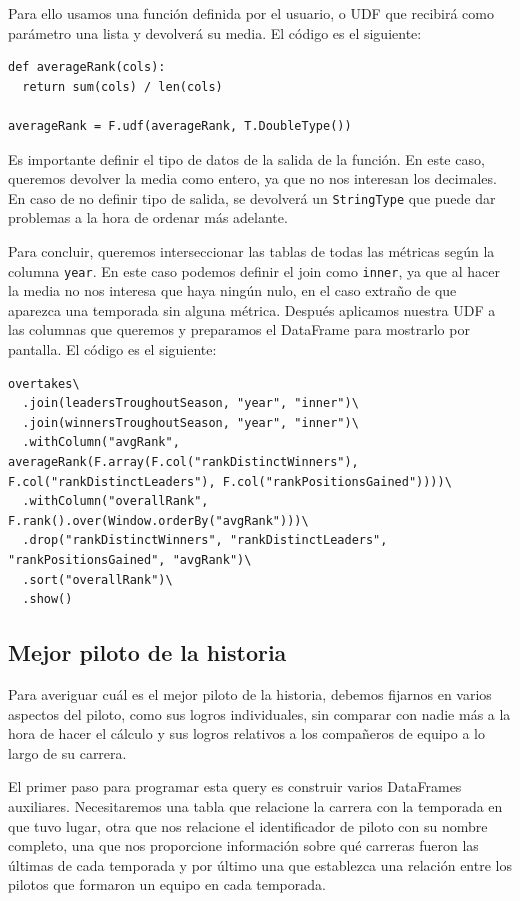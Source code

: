 \documentclass[12pt,twoside,titlepage]{report}
\begin{document}
Para ello usamos una función definida por el usuario, o UDF que recibirá como parámetro una lista y devolverá su media. El código es el siguiente:

\begin{lstlisting}
def averageRank(cols):
  return sum(cols) / len(cols)

averageRank = F.udf(averageRank, T.DoubleType())
\end{lstlisting}

Es importante definir el tipo de datos de la salida de la función. En este caso, queremos devolver la media como entero, ya que no nos interesan los decimales. En caso de no definir tipo de salida, se devolverá un \texttt{StringType} que puede dar problemas a la hora de ordenar más adelante.

Para concluir, queremos interseccionar las tablas de todas las métricas según la columna \texttt{year}. En este caso podemos definir el join como \texttt{inner}, ya que al hacer la media no nos interesa que haya ningún nulo, en el caso extraño de que aparezca una temporada sin alguna métrica. Después aplicamos nuestra UDF a las columnas que queremos y preparamos el DataFrame para mostrarlo por pantalla. El código es el siguiente:

\begin{lstlisting}
overtakes\
  .join(leadersTroughoutSeason, "year", "inner")\
  .join(winnersTroughoutSeason, "year", "inner")\
  .withColumn("avgRank", averageRank(F.array(F.col("rankDistinctWinners"), F.col("rankDistinctLeaders"), F.col("rankPositionsGained"))))\
  .withColumn("overallRank", F.rank().over(Window.orderBy("avgRank")))\
  .drop("rankDistinctWinners", "rankDistinctLeaders", "rankPositionsGained", "avgRank")\
  .sort("overallRank")\
  .show()  
\end{lstlisting}

\subsection{Mejor piloto de la historia}

Para averiguar cuál es el mejor piloto de la historia, debemos fijarnos en varios aspectos del piloto, como sus logros individuales, sin comparar con nadie más a la hora de hacer el cálculo y sus logros relativos a los compañeros de equipo a lo largo de su carrera.

El primer paso para programar esta query es construir varios DataFrames auxiliares. Necesitaremos una tabla que relacione la carrera con la temporada en que tuvo lugar,  otra que nos relacione el identificador de piloto con su nombre completo, una que nos proporcione información sobre qué carreras fueron las últimas de cada temporada y por último una que establezca una relación entre los pilotos que formaron un equipo en cada temporada.
\end{document}
